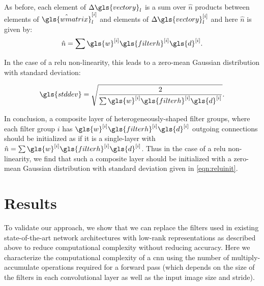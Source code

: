 \documentclass[thesis]{subfiles}
\begin{document}
    As before, each element of $\Delta \gls{vectory}_l$ is a sum over $\hat n$ products between elements of $\hat{\gls{wmatrix}}^{[i]}_l$ and elements of $\Delta \gls{vectory}^{[i]}_l$ and here $\hat{n}$ is given by:
    \begin{equation}
    \hat{n} = \sum{ \gls{w}^{[i]} \gls{filterh}^{[i]} \gls{d}^{[i]}}.
    \end{equation}
    
    In the case of a \gls{relu} non-linearity, this leads to a zero-mean Gaussian distribution with standard deviation:
    
    \begin{equation}
    \gls{stddev} = \sqrt{\frac{2}{\sum{ \gls{w}^{[i]} \gls{filterh}^{[i]} \gls{d}^{[i]}}}}.\label{eqn:reluinit}
    \end{equation}
    
    In conclusion, a composite layer of heterogeneously-shaped filter groups, where each filter group $i$ has $\gls{w}^{[i]} \gls{filterh}^{[i]} \gls{d}^{[i]}$ outgoing connections should be initialized as if it is a single-layer with  $\hat{n} = \sum{ \gls{w}^{[i]} \gls{filterh}^{[i]} \gls{d}^{[i]}}$. Thus in the case of a \gls{relu} non-linearity, we find that such a composite layer should be initialized with a zero-mean Gaussian distribution with standard deviation given in \cref{eqn:reluinit}.
    
    \section{Results}
    To validate our approach, we show that we can replace the filters used in existing state-of-the-art network architectures with low-rank representations as described above to reduce computational complexity without reducing accuracy. Here we characterize the computational complexity of a \gls{cnn} using the number of multiply-accumulate operations required for a forward pass (which depends on the size of the filters in each convolutional layer as well as the input image size and stride).
\end{document}
